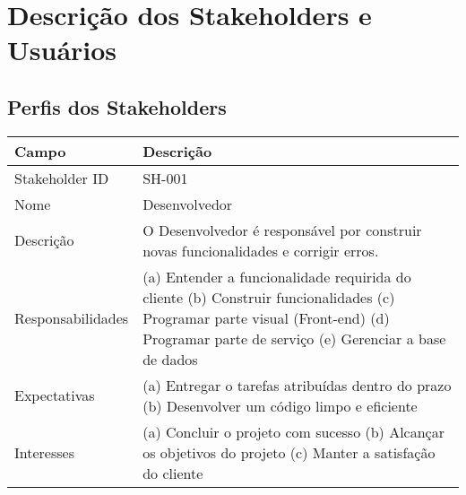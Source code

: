 \chapter{Descrição dos Stakeholders e Usuários}

\section{Perfis dos Stakeholders}

\begin{table}[htbp]
\begin{tabularx}{\textwidth}{| l | X |}
\hline
Campo             & Descrição                                                                                                                                                                           \\ \hline
Stakeholder ID    & SH-001                                                                                                                                                                              \\ \hline
Nome              & Desenvolvedor                                                                                                                                                                       \\ \hline
Descrição         & O Desenvolvedor é responsável por construir novas funcionalidades e corrigir erros.                                                                                                  \\ \hline
Responsabilidades & (a) Entender a funcionalidade requirida do cliente (b) Construir funcionalidades (c) Programar parte visual (Front-end) (d) Programar parte de serviço (e) Gerenciar a base de dados \\ \hline
Expectativas      & (a) Entregar o tarefas atribuídas dentro do prazo (b) Desenvolver um código limpo e eficiente                                                                                   \\ \hline
Interesses        & (a) Concluir o projeto com sucesso (b) Alcançar os objetivos do projeto (c) Manter a satisfação do cliente                                                                           \\ \hline
\end{tabularx}
\end{table}   

